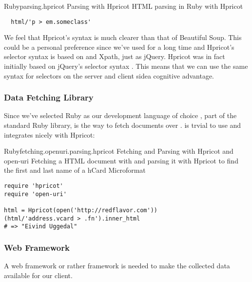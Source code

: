 \begin{scode}{Ruby}{parsing.hpricot}{%
  Parsing with Hpricot}{%
  HTML parsing in Ruby with Hpricot}
\begin{lstlisting}
  html/'p > em.someclass'
\end{lstlisting}
\end{scode}

We feel that Hpricot's syntax is much clearer than that of Beautiful Soup.
This could be a personal preference since we've used  for a long
time and Hpricot's selector syntax is based on  and Xpath, just as
jQuery. Hpricot was in fact initially based on jQuery's selector syntax
\citep{why06}. This means that we can use the same syntax for selectors on the
server and client side\emph{}a cognitive advantage.

\subsubsection{Data Fetching Library}

Since we've selected Ruby as our development language of choice
, part of the standard Ruby library, is the way to fetch
documents over %
.
 is trvial to use and integrates nicely with Hpricot:

\begin{scode}{Ruby}{fetching.openuri.parsing.hpricot}{%
  Fetching and Parsing with Hpricot and open-uri}{%
  Fetching a HTML document with 
  and parsing it with Hpricot to find the first and
  last name of a hCard Microformat}
\begin{lstlisting}
require 'hpricot'
require 'open-uri'

html = Hpricot(open('http://redflavor.com'))
(html/'address.vcard > .fn').inner_html
# => "Eivind Uggedal"
\end{lstlisting}
\end{scode}


\subsubsection{Web Framework}

A web framework or rather 
framework is needed to make the
collected data available for our client.



